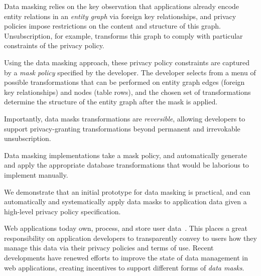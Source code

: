 Data masking relies on the key observation that applications already encode entity relations in an
\emph{entity graph} via \eg foreign key relationships, and privacy policies impose restrictions on the
content and structure of this graph. Unsubscription, for example, transforms this graph to comply
with particular constraints of the privacy policy.

Using the data masking approach, these privacy policy constraints are captured by a \emph{mask
policy} specified by the developer. The developer selects from a menu of
possible transformations that can be performed on entity graph edges (foreign key relationships) and
nodes (table rows), and the chosen set of transformations determine the structure of the 
entity graph after the mask is applied. 

Importantly, data masks transformations are \emph{reversible}, allowing developers to support
privacy-granting transformations beyond permanent and irrevokable unsubscription. 

Data masking implementations take a mask policy, and automatically generate and apply the
appropriate database transformations that would be laborious to implement manually. 


We demonstrate that an initial prototype for data masking is practical, and can automatically and
systematically apply data masks to application data given a high-level privacy policy
specification.

%

\iffalse
Web applications today own, process, and store user data~\cite{nytimes:fb, npr:data}. This places a
great responsibility on application developers to transparently convey to users how they manage this
data via their privacy policies and terms of use.
%
Recent developments have renewed efforts to improve the state of data management in web
applications, creating incentives to support different forms of \emph{data masks}.

